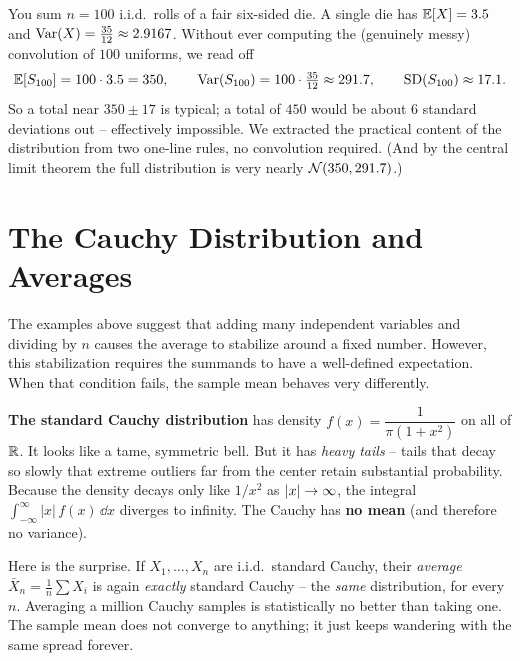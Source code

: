\begin{example}
\label{ch17:ex-meanvar}
You sum $n=100$ i.i.d.\ rolls of a fair six-sided die. A single die has
$\operatorname{\mathbb{E}}[X]=3.5$ and $\operatorname{Var}(X)=\frac{35}{12}\approx 2.9167$. Without ever
computing the (genuinely messy) convolution of $100$ uniforms, we read off
\[
\operatorname{\mathbb{E}}[S_{100}] = 100\cdot 3.5 = 350,\qquad
\operatorname{Var}(S_{100}) = 100\cdot\tfrac{35}{12} \approx 291.7,\qquad
\operatorname{SD}(S_{100}) \approx 17.1.
\]
So a total near $350\pm 17$ is typical; a total of $450$ would be about
$6$ standard deviations out -- effectively impossible. We extracted the
practical content of the distribution from two one-line rules, no
convolution required. (And by the central limit theorem the full
distribution is very nearly $\mathcal{N}(350,291.7)$.)
\end{example}

\section{The Cauchy Distribution and Averages}
\label{ch17:cauchy}

The examples above suggest that adding many independent variables and
dividing by $n$ causes the average to stabilize around a fixed number.
However, this stabilization requires the summands to have a well-defined
expectation. When that condition fails, the sample mean behaves very
differently.

\begin{paradoxbox}
\textbf{The standard Cauchy distribution} has density
$f(x)=\dfrac{1}{\pi(1+x^2)}$ on all of $\mathbb{R}$. It looks like a tame,
symmetric bell. But it has \emph{heavy tails} -- tails that decay so slowly
that extreme outliers far from the center retain substantial probability.
Because the density decays only like $1/x^2$ as $\lvert x\rvert\to\infty$, the
integral $\int_{-\infty}^{\infty} |x|\,f(x)\,\dd x$ diverges to infinity.
The Cauchy has \textbf{no mean} (and therefore no variance).

Here is the surprise. If $X_1,\dots,X_n$ are i.i.d.\ standard Cauchy, their
\emph{average} $\bar X_n=\frac{1}{n}\sum X_i$ is again \emph{exactly}
standard Cauchy -- the \emph{same} distribution, for every $n$. Averaging
a million Cauchy samples is statistically no better than taking one. The
sample mean does not converge to anything; it just keeps wandering with
the same spread forever.
\end{paradoxbox}

